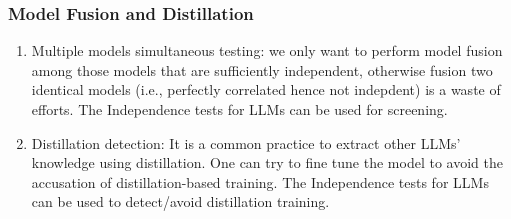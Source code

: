 \subsubsection{Model Fusion and Distillation}

\begin{enumerate}
    \item Multiple models simultaneous testing: we only want to perform model fusion among those models that are sufficiently independent, otherwise fusion two identical models (i.e., perfectly correlated hence not indepdent) is a waste of efforts. The Independence tests for LLMs can be used for screening. 
    \item Distillation detection: It is a common practice to extract other LLMs' knowledge using distillation. One can try to fine tune the model to avoid the accusation of distillation-based training.  The Independence tests for LLMs can be used to detect/avoid distillation training. 
\end{enumerate}